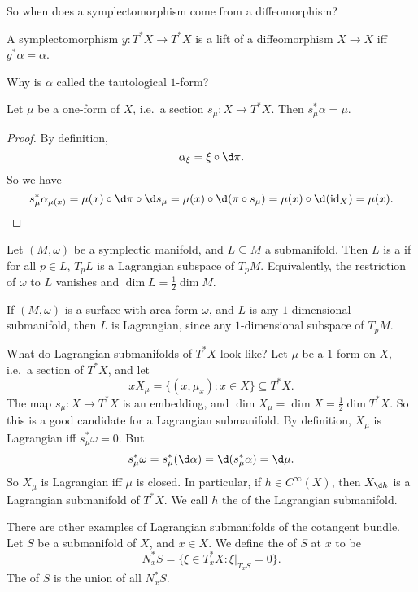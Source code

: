 \documentclass[a4paper]{article}
\begin{document}
So when does a symplectomorphism come from a diffeomorphism?

\begin{ex}
  A symplectomorphism $y: T^* X \to T^* X$ is a lift of a diffeomorphism $X \to X$ iff $g^* \alpha = \alpha$.
\end{ex}

Why is $\alpha$ called the tautological $1$-form?
\begin{prop}
  Let $\mu$ be a one-form of $X$, i.e.\ a section $s_\mu: X \to T^* X$. Then $s_\mu^* \alpha = \mu$.
\end{prop}

\begin{proof}
  By definition,
  \[
    \alpha_\xi = \xi \circ \d \pi.
  \]
  So we have
  \[
    s_\mu^*\alpha_{\mu(x)} = \mu(x) \circ \d \pi \circ \d s_\mu = \mu(x) \circ \d (\pi \circ s_\mu) = \mu(x) \circ \d(\mathrm{id}_X) = \mu(x).\qedhere
  \]
\end{proof}

\begin{defi}
  Let $(M, \omega)$ be a symplectic manifold, and $L \subseteq M$ a submanifold. Then $L$ is a  if for all $p \in L$, $T_p L$ is a Lagrangian subspace of $T_p M$. Equivalently, the restriction of $\omega$ to $L$ vanishes and $\dim L = \frac{1}{2} \dim M$.
\end{defi}

\begin{eg}
  If $(M, \omega)$ is a surface with area form $\omega$, and $L$ is any $1$-dimensional submanifold, then $L$ is Lagrangian, since any $1$-dimensional subspace of $T_p M$.
\end{eg}

What do Lagrangian submanifolds of $T^* X$ look like? Let $\mu$ be a $1$-form on $X$, i.e.\ a section of $T^* X$, and let
\[
  xX_\mu = \{(x, \mu_x): x \in X\} \subseteq T^* X.
\]
The map $s_\mu: X \to T^*X$ is an embedding, and $\dim X_\mu = \dim X = \frac{1}{2} \dim T^* X$. So this is a good candidate for a Lagrangian submanifold. By definition, $X_\mu$ is Lagrangian iff $s_\mu^* \omega = 0$. But
\[
  s_\mu^* \omega = s_\mu^* (\d \alpha) = \d (s_\mu^* \alpha) = \d \mu.
\]
So $X_\mu$ is Lagrangian iff $\mu$ is closed. In particular, if $h \in C^\infty(X)$, then $X_{\d h}$ is a Lagrangian submanifold of $T^* X$. We call $h$ the  of the Lagrangian submanifold.

There are other examples of Lagrangian submanifolds of the cotangent bundle. Let $S$ be a submanifold of $X$, and $x \in X$. We define the  of $S$ at $x$ to be
\[
  N_x^* S = \{\xi \in T_x^* X : \xi|_{T_x S} = 0\}.
\]
The  of $S$ is the union of all $N^*_x S$.
\end{document}
